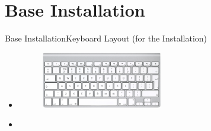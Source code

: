 
\section{Base Installation}

\begin{frame}[fragile]{Base Installation}{Keyboard Layout (for the Installation)}
  \begin{itemize}
    \item {}
    \begin{figure}
      \includegraphics[width=0.5\textwidth]{./figures/keyboard.png}
    \end{figure}
    \item {}
  \end{itemize}
\end{frame}

